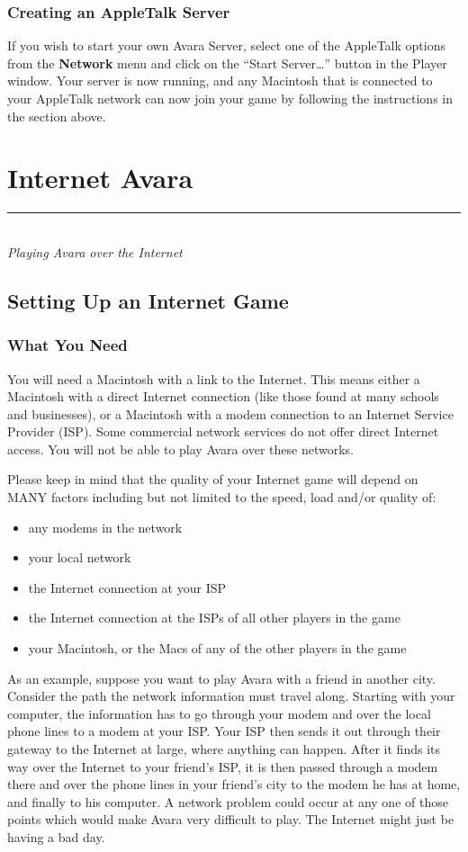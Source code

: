 \documentclass{article}
\let\oldsection\section
\renewcommand\section{\clearpage\oldsection}
\begin{document}
\subsubsection{Creating an AppleTalk Server}
If you wish to start your own Avara Server, select one of the AppleTalk options from the \textbf{Network} menu and click on the ``Start Server\dots'' button in the Player window. Your server is now running, and any Macintosh that is connected to your AppleTalk network can now join your game by following the instructions in the section above.


\section{Internet Avara}
\rule{5.5cm}{.15pt}\\
\rmfamily\textit{Playing Avara over the Internet}

\subsection{Setting Up an Internet Game}
\subsubsection{What You Need}
You will need a Macintosh with a link to the Internet. This means either a Macintosh with a direct Internet connection (like those found at many schools and businesses), or a Macintosh with a modem connection to an Internet Service Provider (ISP). Some commercial network services do not offer direct Internet access. You will not be able to play Avara over these networks.

Please keep in mind that the quality of your Internet game will depend on MANY factors including but not limited to the speed, load and/or quality of:

\begin{itemize}
	\item any modems in the network
	\item your local network
	\item the Internet connection at your ISP
	\item the Internet connection at the ISPs of all other players in the game
	\item your Macintosh, or the Macs of any of the other players in the game
\end{itemize}

As an example, suppose you want to play Avara with a friend in another city. Consider the path the network information must travel along. Starting with your computer, the information has to go through your modem and over the local phone lines to a modem at your ISP. Your ISP then sends it out through their gateway to the Internet at large, where anything can happen. After it finds its way over the Internet to your friend's ISP, it is then passed through a modem there and over the phone lines in your friend's city to the modem he has at home, and finally to his computer. A network problem could occur at any one of those points which would make Avara very difficult to play. The Internet might just be having a bad day.
\end{document}
